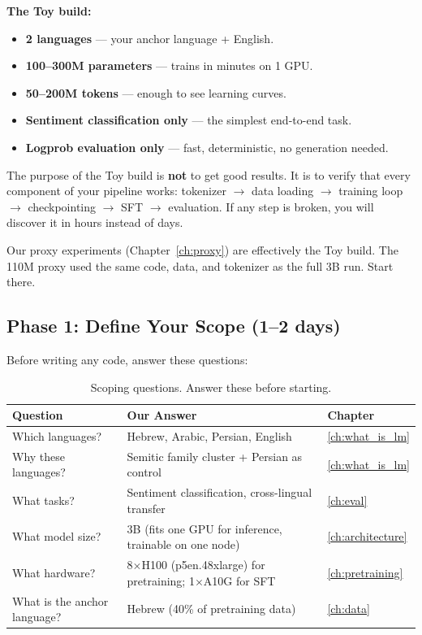\documentclass[11pt,a4paper]{article}
\begin{document}
\textbf{The Toy build:}
\begin{itemize}[nosep]
  \item \textbf{2 languages} --- your anchor language + English.
  \item \textbf{100--300M parameters} --- trains in minutes on 1 GPU.
  \item \textbf{50--200M tokens} --- enough to see learning curves.
  \item \textbf{Sentiment classification only} --- the simplest end-to-end task.
  \item \textbf{Logprob evaluation only} --- fast, deterministic, no generation needed.
\end{itemize}

The purpose of the Toy build is \textbf{not} to get good results. It is to verify that every component of your pipeline works: tokenizer $\rightarrow$ data loading $\rightarrow$ training loop $\rightarrow$ checkpointing $\rightarrow$ SFT $\rightarrow$ evaluation. If any step is broken, you will discover it in hours instead of days.

\begin{tip}
Our proxy experiments (Chapter~\ref{ch:proxy}) are effectively the Toy build. The 110M proxy used the same code, data, and tokenizer as the full 3B run. Start there.
\end{tip}

\subsection{Phase 1: Define Your Scope (1--2 days)}

Before writing any code, answer these questions:

\begin{table}[H]
\centering
\begin{tabular}{lp{8cm}l}
\toprule
\textbf{Question} & \textbf{Our Answer} & \textbf{Chapter} \\
\midrule
Which languages? & Hebrew, Arabic, Persian, English & \ref{ch:what_is_lm} \\
Why these languages? & Semitic family cluster + Persian as control & \ref{ch:what_is_lm} \\
What tasks? & Sentiment classification, cross-lingual transfer & \ref{ch:eval} \\
What model size? & 3B (fits one GPU for inference, trainable on one node) & \ref{ch:architecture} \\
What hardware? & 8$\times$H100 (p5en.48xlarge) for pretraining; 1$\times$A10G for SFT & \ref{ch:pretraining} \\
What is the anchor language? & Hebrew (40\% of pretraining data) & \ref{ch:data} \\
\bottomrule
\end{tabular}
\caption{Scoping questions. Answer these before starting.}
\end{table}
\end{document}
